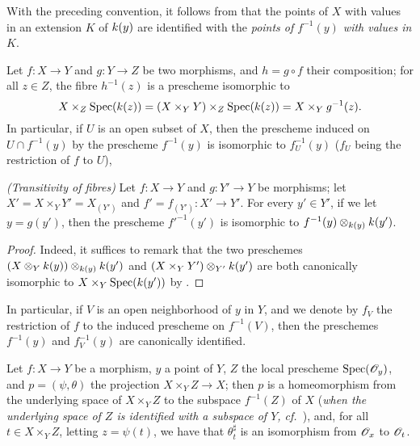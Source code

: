 With the preceding convention, it follows from  that the points of $X$ with values in an extension $K$ of $k(y)$ are identified with the \emph{points of $f^{-1}(y)$ with values in $K$}.

\begin{env}[3.6.3]
\label{1.3.6.3}
Let $f:X\to Y$ and $g:Y\to Z$ be two morphisms, and $h=g\circ f$ their composition; for all $z\in Z$, the fibre $h^{-1}(z)$ is a prescheme isomorphic to
\[
  X\times_Z\operatorname{Spec}(k(z))=(X\times_Y Y)\times_Z\operatorname{Spec}(k(z))=X\times_Y g^{-1}(z).
\]
In particular, if $U$ is an open subset of $X$, then the prescheme induced on $U\cap f^{-1}(y)$ by the prescheme $f^{-1}(y)$ is isomorphic to $f^{-1}_U(y)$ ($f_U$ being the restriction of $f$ to $U$),
\end{env}

\begin{proposition}[3.6.4]
\label{1.3.6.4}
\emph{(Transitivity of fibres)}
Let $f:X\to Y$ and $g:Y'\to Y$ be morphisms; let $X'=X\times_Y Y'=X_{(Y')}$ and $f'=f_{(Y')}:X'\to Y'$.
For every $y'\in Y'$, if we let $y=g(y')$, then the prescheme $f'^{-1}(y')$ is isomorphic to $f^{-1}(y)\otimes_{k(y)}k(y')$.
\end{proposition}

\begin{proof}
\label{proof-1.3.6.4}
Indeed, it suffices to remark that the two preschemes $(X\otimes_Yk(y))\otimes_{k(y)}k(y')$ and $(X\times_Y Y')\otimes_{Y'}k(y')$ are both canonically isomorphic to $X\times_Y\operatorname{Spec}(k(y'))$ by .
\end{proof}

In particular, if $V$ is an open neighborhood of $y$ in $Y$, and we denote by $f_V$ the restriction of $f$ to the induced prescheme on $f^{-1}(V)$, then the preschemes $f^{-1}(y)$ and $f^{-1}_V(y)$ are canonically identified.

\begin{proposition}[3.6.5]
\label{1.3.6.5}
Let $f:X\to Y$ be a morphism, $y$ a point of $Y$, $Z$ the local prescheme $\operatorname{Spec}(\mathscr{O}_y)$, and $p=(\psi,\theta)$ the projection $X\times_Y Z\to X$; then $p$ is a homeomorphism from the underlying space of $X\times_Y Z$ to the subspace $f^{-1}(Z)$ of $X$ (\emph{when the underlying space of $Z$ is identified with a subspace of $Y$, cf.~}), and, for all $t\in X\times_Y Z$, letting $z=\psi(t)$, we have that $\theta_t^\sharp$ is an isomorphism from $\mathscr{O}_x$ to $\mathscr{O}_t$.
\end{proposition}

